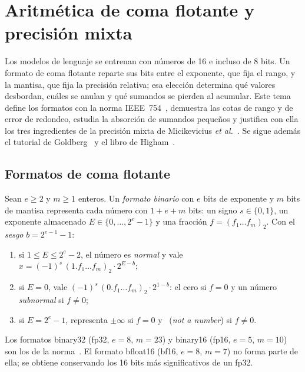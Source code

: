 \chapter{Aritmética de coma flotante y precisión mixta}
\label{tema:5}

Los modelos de lenguaje se entrenan con números de 16 e incluso de 8 bits. Un formato de coma flotante reparte sus bits entre el exponente, que fija el rango, y la mantisa, que fija la precisión relativa; esa elección determina qué valores desbordan, cuáles se anulan y qué sumandos se pierden al acumular. Este tema define los formatos con la norma IEEE~754~\cite{ieee754}, demuestra las cotas de rango y de error de redondeo, estudia la absorción de sumandos pequeños y justifica con ella los tres ingredientes de la precisión mixta de Micikevicius \emph{et al.}~\cite{micikevicius}. Se sigue además el tutorial de Goldberg~\cite{goldberg} y el libro de Higham~\cite{higham}.

\section{Formatos de coma flotante}

\begin{definicion}\label{def:formato}
Sean $e\ge 2$ y $m\ge 1$ enteros. Un \emph{formato binario} con $e$ bits de exponente y $m$ bits de mantisa representa cada número con $1+e+m$ bits: un signo $s\in\{0,1\}$, un exponente almacenado $E\in\{0,\dots,2^{e}-1\}$ y una fracción $f=(f_1\dots f_m)_2$. Con el \emph{sesgo} $b=2^{e-1}-1$:
\begin{enumerate}
  \item si $1\le E\le 2^{e}-2$, el número es \emph{normal} y vale $x=(-1)^{s}\,(1.f_1\dots f_m)_2\cdot 2^{E-b}$;
  \item si $E=0$, vale $(-1)^{s}\,(0.f_1\dots f_m)_2\cdot 2^{1-b}$: el cero si $f=0$ y un número \emph{subnormal} si $f\ne 0$;
  \item si $E=2^{e}-1$, representa $\pm\infty$ si $f=0$ y \NaN\ (\emph{not a number}) si $f\ne 0$.
\end{enumerate}
\end{definicion}

Los formatos binary32 (fp32, $e=8$, $m=23$) y binary16 (fp16, $e=5$, $m=10$) son los de la norma~\cite{ieee754}. El formato bfloat16 (bf16, $e=8$, $m=7$) no forma parte de ella; se obtiene conservando los 16 bits más significativos de un fp32.

